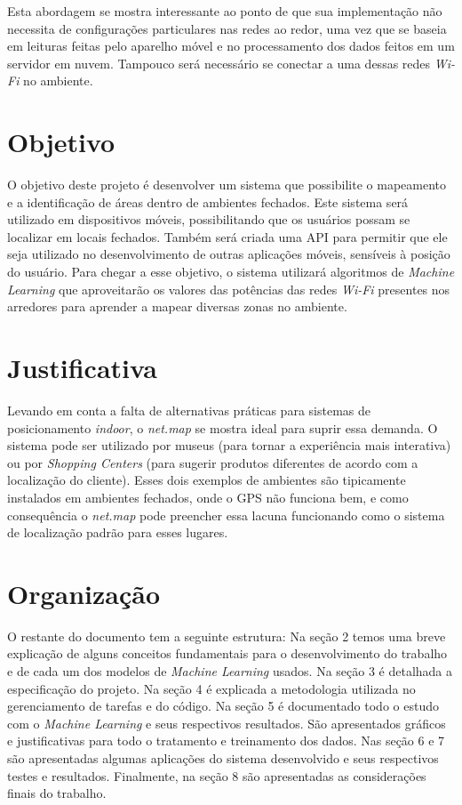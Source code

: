Esta abordagem se mostra interessante ao ponto de que sua implementação não
necessita de configurações particulares nas redes ao redor, uma vez que se baseia
em leituras feitas pelo aparelho móvel e no processamento dos dados feitos em um
servidor em nuvem. Tampouco será necessário se conectar a uma dessas redes
\textit{Wi-Fi} no ambiente.

\section{Objetivo}\label{sec:objetctive}
O objetivo deste projeto é desenvolver um sistema que possibilite
o mapeamento e a identificação de áreas dentro de ambientes fechados. Este
sistema será utilizado em dispositivos móveis, possibilitando que os
usuários possam se localizar em locais fechados. Também será criada uma API para permitir que ele seja utilizado no desenvolvimento de outras aplicações móveis, sensíveis à posição do usuário. Para chegar a esse objetivo, o sistema utilizará algoritmos de \textit{Machine Learning} que aproveitarão os valores das potências das redes \textit{Wi-Fi} presentes nos arredores para aprender a mapear diversas zonas no ambiente.

\section{Justificativa}\label{sec:justify}
Levando em conta a falta de alternativas práticas para sistemas de posicionamento \textit{indoor}, o \textit{net.map} se mostra ideal para suprir essa demanda. O sistema pode ser utilizado por museus (para tornar a experiência mais interativa) ou por \textit{Shopping Centers}  (para sugerir produtos diferentes de acordo com a localização do cliente). Esses dois exemplos de ambientes são tipicamente instalados em ambientes fechados, onde o GPS não funciona bem, e como consequência o \textit{net.map} pode preencher essa lacuna funcionando como o sistema de localização padrão para esses lugares.

\section{Organização}\label{sec:organization}

O restante do documento tem a seguinte estrutura: Na seção 2 temos uma breve explicação de alguns conceitos fundamentais para o desenvolvimento do trabalho e de cada um dos modelos de \textit{Machine Learning} usados. Na seção 3 é detalhada a especificação do projeto. Na seção 4 é explicada a metodologia utilizada no gerenciamento de tarefas e do código. Na seção 5 é documentado todo o estudo com o \textit {Machine Learning} e seus respectivos resultados. São apresentados gráficos e justificativas para todo o tratamento e treinamento dos dados. Nas seção 6 e 7 são apresentadas algumas aplicações do sistema desenvolvido e seus respectivos testes e resultados. Finalmente, na seção 8 são apresentadas as considerações finais do trabalho.